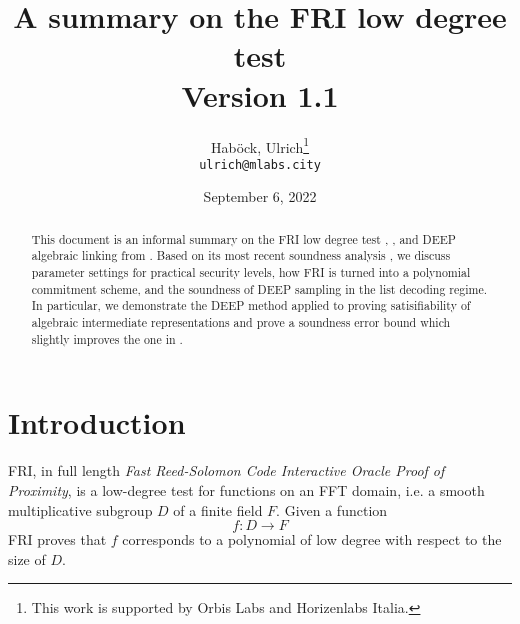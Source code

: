 \documentclass[11pt,article,oneside]{memoir}
\author{
    Hab{\"o}ck, Ulrich\thanks{This work is supported by Orbis Labs and Horizenlabs Italia.}
\\
    \texttt{ulrich@mlabs.city}
}
\theoremstyle{definition}
\theoremstyle{remark}
\begin{document}
\title{%
A summary on the FRI low degree test
\\
{\small Version 1.1}
}
\date{%
September 6, 2022
}
\maketitle

\setlength{\parskip}{5mm}


\begin{abstract}
This document is an informal summary on the FRI low degree test \cite{FRI}, \cite{ProximityGaps}, and DEEP algebraic linking from \cite{DEEPFRI}. 
Based on its most recent soundness analysis \cite{ProximityGaps}, we discuss parameter settings for practical security levels, how FRI is turned into a polynomial commitment scheme, and the soundness of DEEP sampling in the list decoding regime.
In particular, we demonstrate the DEEP method applied to proving satisifiability of algebraic intermediate representations and prove a soundness error bound which slightly improves  the one in \cite{ethSTARK}.
\end{abstract}


\begin{KeepFromToc}
  \tableofcontents
\end{KeepFromToc}

\chapter{Introduction}
FRI, in full length \textit{Fast Reed-Solomon Code Interactive Oracle Proof of Proximity}, is a low-degree test for functions on an FFT domain, i.e. a smooth multiplicative subgroup $D$ of a finite field $F$.  
Given a function 
\[
f: D\longrightarrow F
\]
FRI proves that $f$ corresponds to a polynomial of low degree with respect to the size of $D$. 
\end{document}
